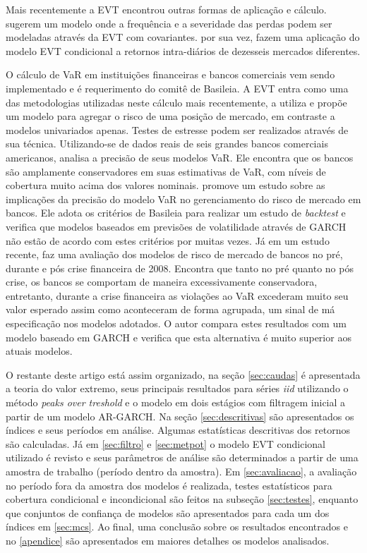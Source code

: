 \documentclass[1p]{elsarticle}
\theoremstyle{definition}
\begin{document}
Mais recentemente a EVT encontrou outras formas de aplicação e cálculo. \cite{Chavez-Demoulin2016} sugerem um modelo onde a frequência e a severidade das perdas podem ser modeladas através da EVT com covariantes.  \cite{Karmakar2016} por sua vez, fazem uma aplicação do modelo EVT condicional a retornos intra-diários de dezesseis mercados diferentes.

O cálculo de VaR em instituições financeiras e bancos comerciais vem sendo implementado e é requerimento do comitê de Basileia. A EVT entra como uma das metodologias utilizadas neste cálculo mais recentemente,  \cite{Longin2000} a utiliza e propõe um modelo para agregar o risco de uma posição de mercado, em contraste a modelos univariados apenas. Testes de estresse podem ser realizados através de sua técnica. Utilizando-se de dados reais de seis grandes bancos comerciais americanos, \cite{Berkowitz2002} analisa a precisão de seus modelos VaR. Ele encontra que os bancos são amplamente conservadores em suas estimativas de VaR, com níveis de cobertura muito acima dos valores nominais. \cite{Wong2003} promove um estudo sobre as implicações da precisão do modelo VaR no gerenciamento do risco de mercado em bancos. Ele adota os critérios de Basileia para realizar um estudo de \emph{backtest} e verifica que modelos baseados em previsões de volatilidade através de GARCH não estão de acordo com estes critérios por muitas vezes. Já em um estudo recente, \cite{OBrien2017} faz uma avaliação dos modelos de risco de mercado de bancos no pré, durante e pós crise financeira de 2008. Encontra que tanto no pré quanto no pós crise, os bancos se comportam de maneira excessivamente conservadora, entretanto, durante a crise financeira as violações ao VaR excederam muito seu valor esperado assim como aconteceram de forma agrupada, um sinal de má especificação nos modelos adotados. O autor compara estes resultados com um modelo baseado em GARCH e verifica que esta alternativa é muito superior aos atuais modelos.

O restante deste artigo está assim organizado, na seção \ref{sec:caudas} é apresentada a teoria do valor extremo, seus principais resultados para séries \emph{iid} utilizando o método \emph{peaks over treshold} e o modelo em dois estágios com filtragem inicial a partir de um modelo AR-GARCH. Na seção \ref{sec:descritivas} são apresentados os índices e seus períodos em análise. Algumas estatísticas descritivas dos retornos são calculadas. Já em \ref{sec:filtro} e \ref{sec:metpot} o modelo EVT condicional utilizado é revisto e seus parâmetros de análise são determinados a partir de uma amostra de trabalho (período dentro da amostra). Em \ref{sec:avaliacao}, a avaliação no período fora da amostra dos modelos é realizada, testes estatísticos para cobertura condicional e incondicional são feitos na subseção \ref{sec:testes}, enquanto que conjuntos de confiança de modelos são apresentados para cada um dos índices em \ref{sec:mcs}. Ao final, uma conclusão sobre os resultados encontrados e no \ref{apendice} são apresentados em maiores detalhes os modelos analisados.
\end{document}
